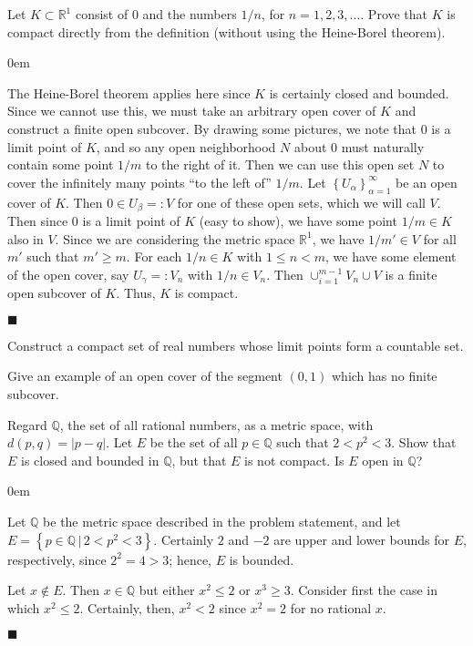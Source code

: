 \documentclass[12pt]{article}
\renewcommand{\qed}{\hfill$\blacksquare$}
\renewenvironment{proof}{\begin{addmargin}[1em]{0em}\begin{newproof}}{\end{newproof}\end{addmargin}\qed}
\newenvironment{problem}[2][Exercise]{\begin{trivlist}
\item[\hskip \labelsep {\bfseries #1}\hskip \labelsep {\bfseries #2.}]}{\end{trivlist}}
\begin{document}
\begin{problem}{2.12}
Let $K\subset \mathbb{R}^1$ consist of $0$ and the numbers $1/n$, for $n=1,2,3,\ldots $. Prove that $K$ is compact directly from the definition (without using the Heine-Borel theorem).
\end{problem}
\begin{proof}
{\color{red}The Heine-Borel theorem applies here since $K$ is certainly closed and bounded. Since we cannot use this, we must take an arbitrary open cover of $K$ and construct a finite open subcover. By drawing some pictures, we note that $0$ is a limit point of $K$, and so any open neighborhood $N$ about $0$ must naturally contain some point $1/m$ to the right of it. Then we can use this open set $N$ to cover the infinitely many points ``to the left of'' $1/m$. } Let $\left\{U_{\alpha}\right\}_{\alpha =1}^{\infty}$ be an open cover of $K$. Then $0\in U_{\beta}=:V $ for one of these open sets, which we will call $V$. Then since $0$ is a limit point of $K$ {\color{red}(easy to show)}, we have some point $1/m \in K$ also in $V$. Since we are considering the metric space $\mathbb{R}^1$, we have $1/m' \in V$ for all $ m' $ such that $m' \geq m$. For each $1/n \in K$ with $1\leq n < m$, we have some element of the open cover, say $U_{\gamma}=:V_n$ with $1/n \in V_n$. Then $\cup_{i=1}^{m-1} V_n \cup V $ is a finite open subcover of $K$. Thus, $K$ is compact.
\end{proof}



\begin{problem}{2.13}
Construct a compact set of real numbers whose limit points form a countable set.
\end{problem}




\begin{problem}{2.14}
Give an example of an open cover of the segment $\left(0,1\right)$ which has no finite subcover.
\end{problem}


\begin{problem}{2.16}
Regard $\mathbb{Q}$, the set of all rational numbers, as a metric space, with $d\left(p,q\right)=\left|p-q\right|$. Let $E$ be the set of all $p\in \mathbb{Q}$ such that $2 < p^2 < 3$. Show that $E$ is closed and bounded in $\mathbb{Q}$, but that $E$ is not compact. Is $E$ open in $\mathbb{Q}$?
\end{problem}
\begin{proof}
Let $\mathbb{Q}$ be the metric space described in the problem statement, and let $E = \left\{p\in \mathbb{Q}\,|\, 2<p^2<3\right\}$. Certainly $2$ and $-2$ are upper and lower bounds for $E$, respectively, since $2^2 =4 > 3$; hence, $E$ is bounded. 

Let $x \notin E$. Then $x\in \mathbb{Q}$ but either $x^2 \leq 2$ or $x^3 \geq 3$. Consider first the case in which $x^2 \leq 2$. Certainly, then, $x^2<2 $ since $x^2=2$ for no rational $x$. 

\end{proof}
\end{document}
